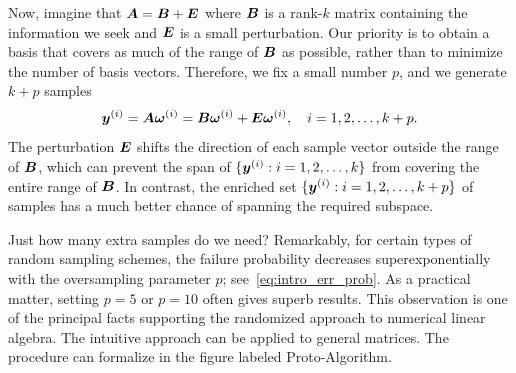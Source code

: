 \documentclass{article}
\begin{document}

Now, imagine that $\bm{A} = \bm{B} + \bm{E}$ where $\bm{B}$ is a rank-$k$
matrix containing the information we seek and $\bm{E}$ is a small
perturbation.  Our priority is to obtain a basis that covers as much of the
range of $\bm{B}$ as possible, rather than to minimize the number of basis vectors.
Therefore, we fix a small number $p$, %
and we generate $k+p$ samples
\begin{equation}
\bm{y}^{(i)} = \bm{A} \bm{\omega}^{(i)}
	= \bm{B} \bm{\omega}^{(i)} + \bm{E} \bm{\omega}^{(i)},
\quad
i = 1, 2, \dots, k + p.
\end{equation}
The perturbation $\bm{E}$ shifts the direction of each sample
vector outside the range of $\bm{B}$, which can prevent the span of
$\{\bm{y}^{(i)} : i = 1, 2, \dots, k \}$ from covering
the entire range of $\bm{B}$.  In contrast, the enriched set
$\{\bm{y}^{(i)} :  i = 1, 2, \dots, k + p \}$ of samples has a much better chance
of spanning the required subspace.

Just how many extra samples do we need?  Remarkably,
for certain types of random sampling schemes,
the failure probability decreases superexponentially with
the oversampling parameter $p$; see~\eqref{eq:intro_err_prob}.
As a practical matter, setting $p = 5$ or $p = 10$
often gives superb results.
This observation is one of the principal facts supporting the randomized
approach to numerical linear algebra.
The intuitive approach can be applied
to general matrices. The procedure can formalize in the figure labeled Proto-Algorithm.


\end{document}
